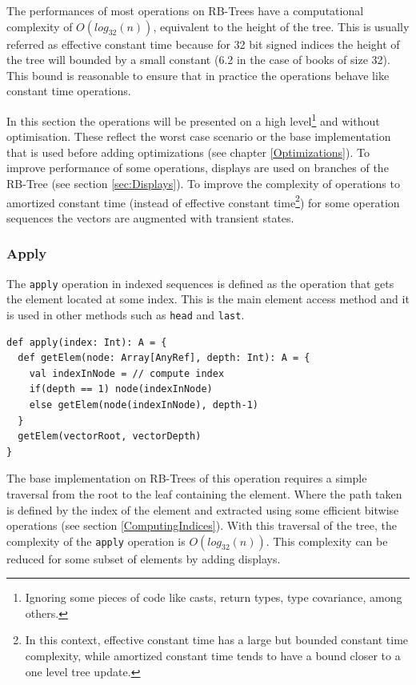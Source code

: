 The performances of most operations on RB-Trees have a computational complexity of $O(log_{32}(n))$, equivalent to the height of the tree. This is usually referred as effective constant time because for 32 bit signed indices the height of the tree will bounded by a small constant (6.2 in the case of books of size 32). This bound is reasonable to ensure that in practice the operations behave like constant time operations.  
 
In this section the operations will be presented on a high level\footnote{Ignoring some pieces of code like casts, return types, type covariance, among others.} and without optimisation. These reflect the worst case scenario or the base implementation that is used before adding optimizations (see chapter \ref{Optimizations}). To improve performance of some operations, displays are used on branches of the RB-Tree (see section \ref{sec:Displays}). To improve the complexity of operations to amortized constant time (instead of effective constant time\footnote{In this context, effective constant time has a large but bounded constant time complexity, while amortized constant time tends to have a bound closer to a one level tree update.}) for some operation sequences the vectors are augmented with transient states.


\subsubsection{Apply}
\label{sec:apply}
The \texttt{apply} operation in indexed sequences is defined as the operation that gets the element located at some index. This is the main element access method and it is used in other methods such as \texttt{head} and \texttt{last}.

\begin{lstlisting}[frame=single]
def apply(index: Int): A = {
  def getElem(node: Array[AnyRef], depth: Int): A = {
    val indexInNode = // compute index
    if(depth == 1) node(indexInNode)
    else getElem(node(indexInNode), depth-1) 
  }
  getElem(vectorRoot, vectorDepth)
}
\end{lstlisting}

The base implementation on RB-Trees of this operation requires a simple traversal from the root to the leaf containing the element. Where the path taken is defined by the index of the element and extracted using some efficient bitwise operations (see section \ref{ComputingIndices}). With this traversal of the tree, the complexity of the \texttt{apply} operation is $O(log_{32}(n))$. This complexity can be reduced for some subset of elements by adding displays.


